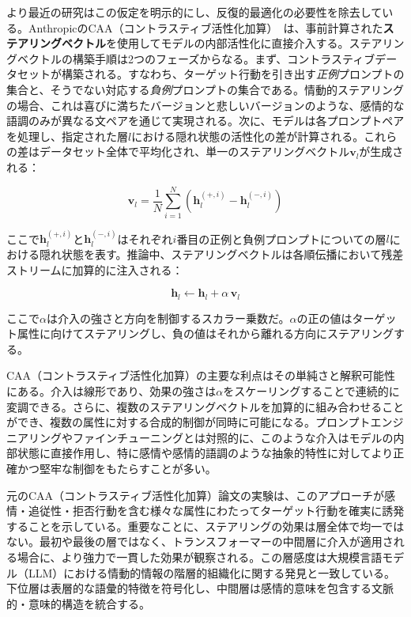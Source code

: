 より最近の研究はこの仮定を明示的にし、反復的最適化の必要性を除去している。AnthropicのCAA（コントラスティブ活性化加算）~\cite{caa}は、事前計算された\textbf{ステアリングベクトル}を使用してモデルの内部活性化に直接介入する。ステアリングベクトルの構築手順は2つのフェーズからなる。まず、コントラスティブデータセットが構築される。すなわち、ターゲット行動を引き出す\textit{正例}プロンプトの集合と、そうでない対応する\textit{負例}プロンプトの集合である。情動的ステアリングの場合、これは喜びに満ちたバージョンと悲しいバージョンのような、感情的な語調のみが異なる文ペアを通じて実現される。次に、モデルは各プロンプトペアを処理し、指定された層$l$における隠れ状態の活性化の差が計算される。これらの差はデータセット全体で平均化され、単一のステアリングベクトル$\mathbf{v}_l$が生成される：

\begin{equation}
    \mathbf{v}_l = \frac{1}{N}\sum_{i=1}^{N}\left(\mathbf{h}_l^{(+,i)} - \mathbf{h}_l^{(-,i)}\right)
\end{equation}

\noindent ここで$\mathbf{h}_l^{(+,i)}$と$\mathbf{h}_l^{(-,i)}$はそれぞれ$i$番目の正例と負例プロンプトについての層$l$における隠れ状態を表す。推論中、ステアリングベクトルは各順伝播において残差ストリームに加算的に注入される：

\begin{equation}
    \mathbf{h}_l \leftarrow \mathbf{h}_l + \alpha\,\mathbf{v}_l
\end{equation}

\noindent ここで$\alpha$は介入の強さと方向を制御するスカラー乗数だ。$\alpha$の正の値はターゲット属性に向けてステアリングし、負の値はそれから離れる方向にステアリングする。

CAA（コントラスティブ活性化加算）の主要な利点はその単純さと解釈可能性にある。介入は線形であり、効果の強さは$\alpha$をスケーリングすることで連続的に変調できる。さらに、複数のステアリングベクトルを加算的に組み合わせることができ、複数の属性に対する合成的制御が同時に可能になる。プロンプトエンジニアリングやファインチューニングとは対照的に、このような介入はモデルの内部状態に直接作用し、特に感情や感情的語調のような抽象的特性に対してより正確かつ堅牢な制御をもたらすことが多い。

元のCAA（コントラスティブ活性化加算）論文の実験は、このアプローチが感情・追従性・拒否行動を含む様々な属性にわたってターゲット行動を確実に誘発することを示している。重要なことに、ステアリングの効果は層全体で均一ではない。最初や最後の層ではなく、トランスフォーマーの中間層に介入が適用される場合に、より強力で一貫した効果が観察される。この層感度は大規模言語モデル（LLM）における情動的情報の階層的組織化に関する発見と一致している。下位層は表層的な語彙的特徴を符号化し、中間層は感情的意味を包含する文脈的・意味的構造を統合する。

